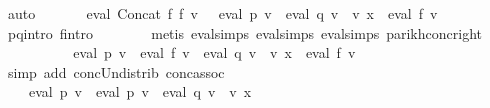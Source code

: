 \begin{isabellebody}
\ auto\isanewline
\ \ \ \ \isamarkupfalse%
\ {\isachardoublequoteopen}{\isasymPsi}\ {\isacharparenleft}{\kern0pt}eval\ {\isacharparenleft}{\kern0pt}Concat\ f{}\ f{}{\isacharparenright}{\kern0pt}\ v{\isacharparenright}{\kern0pt}\ {\isacharequal}{\kern0pt}\ {\isasymPsi}\ {\isacharparenleft}{\kern0pt}{\isacharparenleft}{\kern0pt}eval\ p{}\ v\ {\isasymunion}\ eval\ q{}\ v\ {\isacharat}{\kern0pt}{\isacharat}{\kern0pt}\ v\ x{\isacharparenright}{\kern0pt}\ {\isacharat}{\kern0pt}{\isacharat}{\kern0pt}\ eval\ f{}\ v{\isacharparenright}{\kern0pt}{\isachardoublequoteclose}\isanewline
\ \ \ \ \ \ \isamarkupfalse%
\ p{}{\isacharunderscore}{\kern0pt}q{}{\isacharunderscore}{\kern0pt}intro\ f{}{\isacharprime}{\kern0pt}{\isacharunderscore}{\kern0pt}intro\isanewline
\ \ \ \ \ \ \isamarkupfalse%
\ {\isacharparenleft}{\kern0pt}metis\ eval{\isachardot}{\kern0pt}simps{\isacharparenleft}{\kern0pt}{}{\isacharparenright}{\kern0pt}\ eval{\isachardot}{\kern0pt}simps{\isacharparenleft}{\kern0pt}{}{\isacharparenright}{\kern0pt}\ eval{\isachardot}{\kern0pt}simps{\isacharparenleft}{\kern0pt}{}{\isacharparenright}{\kern0pt}\ parikh{\isacharunderscore}{\kern0pt}conc{\isacharunderscore}{\kern0pt}right{\isacharparenright}{\kern0pt}\isanewline
\ \ \ \ \isamarkupfalse%
\ \isamarkupfalse%
\ {\isachardoublequoteopen}{\isasymdots}\ {\isacharequal}{\kern0pt}\ {\isasymPsi}\ {\isacharparenleft}{\kern0pt}eval\ p{}\ v\ {\isacharat}{\kern0pt}{\isacharat}{\kern0pt}\ eval\ f{}\ v\ {\isasymunion}\ eval\ q{}\ v\ {\isacharat}{\kern0pt}{\isacharat}{\kern0pt}\ v\ x\ {\isacharat}{\kern0pt}{\isacharat}{\kern0pt}\ eval\ f{}\ v{\isacharparenright}{\kern0pt}{\isachardoublequoteclose}\isanewline
\ \ \ \ \ \ \isamarkupfalse%
\ {\isacharparenleft}{\kern0pt}simp\ add{\isacharcolon}{\kern0pt}\ conc{\isacharunderscore}{\kern0pt}Un{\isacharunderscore}{\kern0pt}distrib{\isacharparenleft}{\kern0pt}{}{\isacharparenright}{\kern0pt}\ conc{\isacharunderscore}{\kern0pt}assoc{\isacharparenright}{\kern0pt}\isanewline
\ \ \ \ \isamarkupfalse%
\ \isamarkupfalse%
\ {\isachardoublequoteopen}{\isasymdots}\ {\isacharequal}{\kern0pt}\ {\isasymPsi}\ {\isacharparenleft}{\kern0pt}eval\ p{}\ v\ {\isacharat}{\kern0pt}{\isacharat}{\kern0pt}\ {\isacharparenleft}{\kern0pt}eval\ p{}\ v\ {\isasymunion}\ eval\ q{}\ v\ {\isacharat}{\kern0pt}{\isacharat}{\kern0pt}\ v\ x{\isacharparenright}{\kern0pt}\isanewline

\end{isabellebody}
